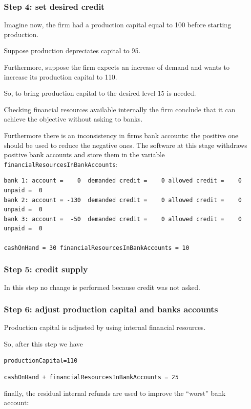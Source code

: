 \documentclass{article}
\begin{document}
	\subsubsection*{Step 4: set desired credit}
	Imagine now, the firm had a production capital equal to 100 before starting production. 
	
	Suppose production depreciates capital to 95.

	Furthermore, suppose the firm expects an increase of demand and wants to increase its production capital to 110.

	So, to bring production capital to the desired level 15 is needed.

	Checking financial resources available internally the firm conclude that it can achieve the objective without asking to banks. 

	Furthermore there is an inconsistency in firms bank accounts: the positive one should be used to reduce the negative ones. The software at this stage withdraws positive bank accounts and store them in the variable \verb+financialResourcesInBankAccounts+:

\begin{verbatim}
bank 1: account =    0  demanded credit =    0 allowed credit =    0 unpaid =  0
bank 2: account = -130  demanded credit =    0 allowed credit =    0 unpaid =  0
bank 3: account =  -50  demanded credit =    0 allowed credit =    0 unpaid =  0

cashOnHand = 30 financialResourcesInBankAccounts = 10
\end{verbatim}

	\subsubsection*{Step 5: credit supply}
In this step no change is performed because credit was not asked.

	\subsubsection*{Step 6: adjust production capital and banks accounts}

	Production capital is adjusted by using internal financial resources. 

	So, after this step we have

	\verb+productionCapital=110+

	\verb/cashOnHand + financialResourcesInBankAccounts = 25/

	finally, the residual internal refunds are used to improve the ``worst'' bank account:
\end{document}
